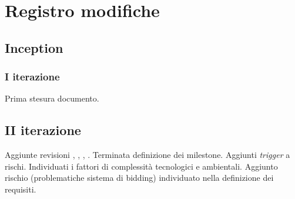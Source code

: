 \documentclass[10pt]{softeng}
\begin{document}
\startofdocument

\clearpage





\clearpage



\clearpage



\clearpage



\clearpage

\section{Registro modifiche}

\subsection{Inception}

\subsubsection{I iterazione}

Prima stesura documento.

\subsection{II iterazione}

Aggiunte revisioni , , , .
Terminata definizione dei milestone.
Aggiunti \emph{trigger} a rischi.
Individuati i fattori di complessit\`a tecnologici e ambientali.
Aggiunto rischio  (problematiche sistema di bidding) individuato nella definizione dei requisiti.
\end{document}

